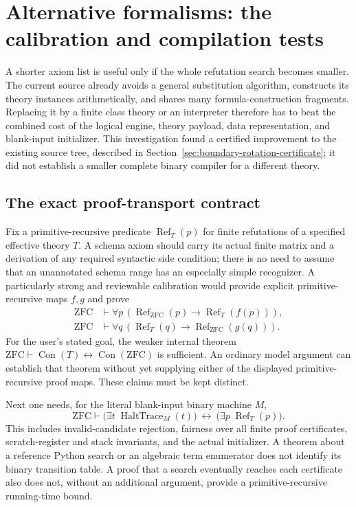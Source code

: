 \section{Alternative formalisms: the calibration and compilation tests}
\label{sec:alternative-formalisms}

A shorter axiom list is useful only if the whole refutation search becomes
smaller.  The current source already avoids a general substitution
algorithm, constructs its theory instances arithmetically, and shares many
formula-construction fragments.  Replacing it by a finite class theory or
an interpreter therefore has to beat the combined cost of the logical
engine, theory payload, data representation, and blank-input initializer.
This investigation found a certified improvement to the existing source
tree, described in Section~\ref{sec:boundary-rotation-certificate}; it did
not establish a smaller complete binary compiler for a different theory.

\subsection{The exact proof-transport contract}

Fix a primitive-recursive predicate $\operatorname{Ref}_T(p)$ for finite
refutations of a specified effective theory $T$.  A schema axiom should
carry its actual finite matrix and a derivation of any required syntactic
side condition; there is no need to assume that an unannotated schema
range has an especially simple recognizer.  A particularly strong and
reviewable calibration would provide explicit primitive-recursive maps
$f,g$ and prove
\[
\begin{split}
 \mathrm{ZFC}&\vdash\forall p\,
   (\operatorname{Ref}_{\mathrm{ZFC}}(p)
            \longrightarrow\operatorname{Ref}_T(f(p))),\\
 \mathrm{ZFC}&\vdash\forall q\,
   (\operatorname{Ref}_T(q)
            \longrightarrow\operatorname{Ref}_{\mathrm{ZFC}}(g(q))).
\end{split}
\]
For the user's stated goal, the weaker internal theorem
$\mathrm{ZFC}\vdash\operatorname{Con}(T)\leftrightarrow
\operatorname{Con}(\mathrm{ZFC})$ is sufficient.  An ordinary model
argument can establish that theorem without yet supplying either of the
displayed primitive-recursive proof maps.  These claims must be kept
distinct.

Next one needs, for the literal blank-input binary machine $M$,
\[
 \mathrm{ZFC}\vdash
 \bigl(\exists t\;\operatorname{HaltTrace}_M(t)\bigr)
 \ \longleftrightarrow\
 \bigl(\exists p\;\operatorname{Ref}_T(p)\bigr).
\]
This includes invalid-candidate rejection, fairness over all finite proof
certificates, scratch-register and stack invariants, and the actual
initializer.  A theorem about a reference Python search or an algebraic
term enumerator does not identify its binary transition table.  A proof
that a search eventually reaches each certificate also does not, without
an additional argument, provide a primitive-recursive running-time bound.


